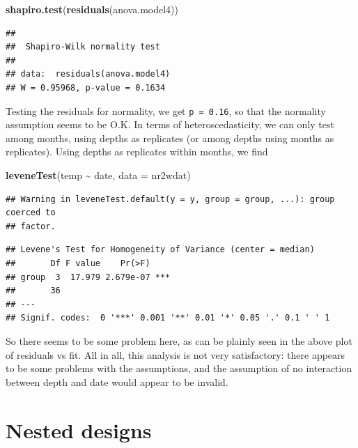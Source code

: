 \documentclass[
  12pt,
]{book}
\newenvironment{Shaded}{\begin{snugshade}}{\end{snugshade}}
\newcommand{\DataTypeTok}[1]{\textcolor[rgb]{0.13,0.29,0.53}{#1}}
\newcommand{\KeywordTok}[1]{\textcolor[rgb]{0.13,0.29,0.53}{\textbf{#1}}}
\newcommand{\NormalTok}[1]{#1}
\newcommand{\OperatorTok}[1]{\textcolor[rgb]{0.81,0.36,0.00}{\textbf{#1}}}
\newcommand{\StringTok}[1]{\textcolor[rgb]{0.31,0.60,0.02}{#1}}
\begin{document}
\begin{Shaded}
\begin{Highlighting}[]
\KeywordTok{shapiro.test}\NormalTok{(}\KeywordTok{residuals}\NormalTok{(anova.model4))}
\end{Highlighting}
\end{Shaded}

\begin{verbatim}
## 
##  Shapiro-Wilk normality test
## 
## data:  residuals(anova.model4)
## W = 0.95968, p-value = 0.1634
\end{verbatim}

Testing the residuals for normality, we get \texttt{p\ =\ 0.16}, so that the normality assumption seems to be O.K. In terms of heteroscedasticity, we can only test among months, using depths as replicates (or among depths using months as replicates). Using depths as replicates within months, we find

\begin{Shaded}
\begin{Highlighting}[]
\KeywordTok{leveneTest}\NormalTok{(temp }\OperatorTok{\textasciitilde{}}\StringTok{ }\NormalTok{date, }\DataTypeTok{data =}\NormalTok{ nr2wdat)}
\end{Highlighting}
\end{Shaded}

\begin{verbatim}
## Warning in leveneTest.default(y = y, group = group, ...): group coerced to
## factor.
\end{verbatim}

\begin{verbatim}
## Levene's Test for Homogeneity of Variance (center = median)
##       Df F value    Pr(>F)    
## group  3  17.979 2.679e-07 ***
##       36                      
## ---
## Signif. codes:  0 '***' 0.001 '**' 0.01 '*' 0.05 '.' 0.1 ' ' 1
\end{verbatim}

So there seems to be some problem here, as can be plainly seen in the above plot of residuals vs fit. All in all, this analysis is not very satisfactory: there appears to be some problems with the assumptions, and the assumption of no interaction between depth and date would appear to be invalid.

\hypertarget{nested-designs}{%
\section{Nested designs}\label{nested-designs}}
\end{document}
